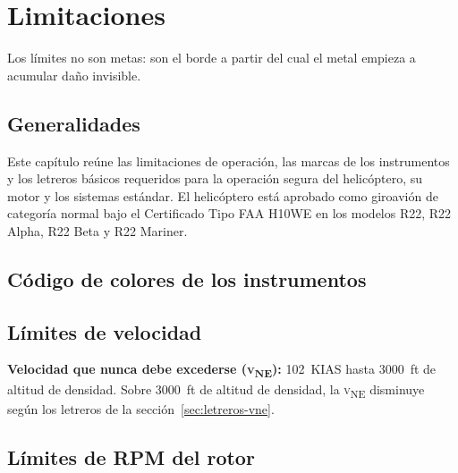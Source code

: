 \chapter{Limitaciones}
\label{cap:limitaciones}

\opening{Los límites no son metas: son el borde a partir del cual el metal empieza a acumular daño invisible.}

\section{Generalidades}

Este capítulo reúne las limitaciones de operación, las marcas de los instrumentos y los letreros básicos requeridos para la operación segura del helicóptero, su motor y los sistemas estándar. El helicóptero está aprobado como giroavión de categoría normal bajo el Certificado Tipo FAA H10WE en los modelos R22, R22 Alpha, R22 Beta y R22 Mariner.

\section{Código de colores de los instrumentos}

\begin{checklist}
\end{checklist}

\section{Límites de velocidad}

\textbf{Velocidad que nunca debe excederse (\textsc{v}\textsubscript{NE}):} 102~KIAS hasta 3000~ft de altitud de densidad. Sobre 3000~ft de altitud de densidad, la \textsc{v}\textsubscript{NE} disminuye según los letreros de la sección~\ref{sec:letreros-vne}.

\section{Límites de RPM del rotor}

